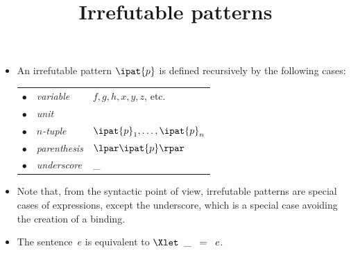\documentclass[wide]{slides}
\begin{document}
\begin{slide}
  \title{Irrefutable patterns}

  \begin{itemize}

    \item An irrefutable pattern $\ipat{p}$ is defined recursively by
      the following cases:\\
      \smallskip
      \begin{tabular}{r@{\,\,}ll@{}}
        $\bullet$
        & \emph{variable}
        & $f, g, h, x, y, z$, etc. \\
        $\bullet$
        & \emph{unit}
        & \unit\\
        $\bullet$
        & \emph{$n$-tuple}
        & $\ipat{p}_1, \ldots, \ipat{p}_n$\\
        $\bullet$
        & \emph{parenthesis}
        & $\lpar\ipat{p}\rpar$\\
        $\bullet$
        & \emph{underscore}
        & {\Large \_}
      \end{tabular}

      \item Note that, from the syntactic point of view, irrefutable
        patterns are special cases of expressions, except the
        underscore, which is a special case avoiding the creation of a
        binding.

      \item The sentence~\(e\) is equivalent to \(\Xlet \;\; \_ \;\; =
        \;\; e\).

  \end{itemize}

\end{slide}
\end{document}
